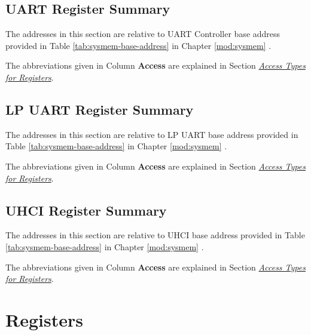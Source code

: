 \documentclass[main\_\_EN.tex]{subfiles}
\begin{document}
\subsection{UART Register Summary}

The addresses in this section are relative to UART Controller base address provided in Table \ref{tab:sysmem-base-address} in Chapter \ref{mod:sysmem} \textit{}.

The abbreviations given in Column \textbf{Access} are explained in Section \hyperref[glossary-access-types]{\textit{Access Types for Registers}}.



\subsection{LP UART Register Summary}

The addresses in this section are relative to LP UART base address provided in Table \ref{tab:sysmem-base-address} in Chapter \ref{mod:sysmem} \textit{}.

The abbreviations given in Column \textbf{Access} are explained in Section \hyperref[glossary-access-types]{\textit{Access Types for Registers}}.




\subsection{UHCI Register Summary}

The addresses in this section are relative to UHCI base address provided in Table \ref{tab:sysmem-base-address} in Chapter \ref{mod:sysmem} \textit{}.

The abbreviations given in Column \textbf{Access} are explained in Section \hyperref[glossary-access-types]{\textit{Access Types for Registers}}.






\clearpage
\section{Registers}
\end{document}
